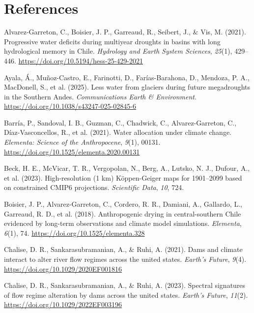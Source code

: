 \documentclass[
]{agujournal2019}
\newlength{\cslhangindent}
\newenvironment{CSLReferences}[2] %
 {\begin{list}{}{%
  \setlength{\itemindent}{0pt}
  \setlength{\leftmargin}{0pt}
  \setlength{\parsep}{0pt}
  \ifodd #1
   \setlength{\leftmargin}{\cslhangindent}
   \setlength{\itemindent}{-1\cslhangindent}
  \fi
  \setlength{\itemsep}{#2\baselineskip}}}
 {\end{list}}
\begin{document}
\section*{References}\label{references}

\label{refs}
\begin{CSLReferences}{1}{0}
Alvarez-Garreton, C., Boisier, J. P., Garreaud, R., Seibert, J., \& Vis,
M. (2021). Progressive water deficits during multiyear droughts in
basins with long hydrological memory in {Chile}. \emph{Hydrology and
Earth System Sciences}, \emph{25}(1), 429--446.
\url{https://doi.org/10.5194/hess-25-429-2021}

Ayala, Á., Muñoz-Castro, E., Farinotti, D., Farías-Barahona, D.,
Mendoza, P. A., MacDonell, S., et al. (2025). Less water from glaciers
during future megadroughts in the {Southern} {Andes}.
\emph{Communications Earth \& Environment}.
\url{https://doi.org/10.1038/s43247-025-02845-6}

Barría, P., Sandoval, I. B., Guzman, C., Chadwick, C., Alvarez-Garreton,
C., Díaz-Vasconcellos, R., et al. (2021). Water allocation under climate
change. \emph{Elementa: Science of the Anthropocene}, \emph{9}(1),
00131. \url{https://doi.org/10.1525/elementa.2020.00131}

Beck, H. E., McVicar, T. R., Vergopolan, N., Berg, A., Lutsko, N. J.,
Dufour, A., et al. (2023). High-resolution ({1} km) {Köppen}-{Geiger}
maps for 1901--2099 based on constrained {CMIP6} projections.
\emph{Scientific Data}, \emph{10}, 724.

Boisier, J. P., Alvarez-Garreton, C., Cordero, R. R., Damiani, A.,
Gallardo, L., Garreaud, R. D., et al. (2018). Anthropogenic drying in
central-southern {Chile} evidenced by long-term observations and climate
model simulations. \emph{Elementa}, \emph{6}(1), 74.
\url{https://doi.org/10.1525/elementa.328}

Chalise, D. R., Sankarasubramanian, A., \& Ruhi, A. (2021). Dams and
climate interact to alter river flow regimes across the united states.
\emph{Earth's Future}, \emph{9}(4).
\url{https://doi.org/10.1029/2020EF001816}

Chalise, D. R., Sankarasubramanian, A., \& Ruhi, A. (2023). Spectral
signatures of flow regime alteration by dams across the united states.
\emph{Earth's Future}, \emph{11}(2).
\url{https://doi.org/10.1029/2022EF003196}


\end{CSLReferences}
\end{document}
